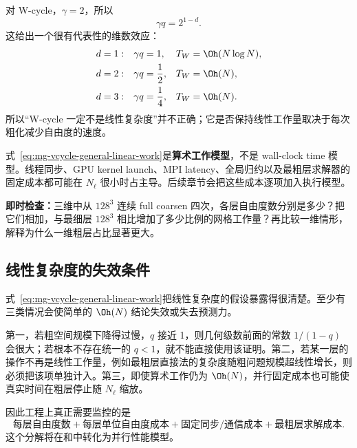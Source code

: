 对 W-cycle，$\gamma=2$，所以
\begin{equation}
\gamma q
=
2^{1-d}.
\end{equation}
这给出一个很有代表性的维数效应：
\begin{equation}
\begin{aligned}
d=1:&\quad \gamma q=1,
&&T_W=\Oh(N\log N),\\
d=2:&\quad \gamma q=\frac12,
&&T_W=\Oh(N),\\
d=3:&\quad \gamma q=\frac14,
&&T_W=\Oh(N).
\end{aligned}
\label{eq:mg-wcycle-dimensional-complexity}
\end{equation}
所以“W-cycle 一定不是线性复杂度”并不正确；它是否保持线性工作量取决于每次粗化减少自由度的速度。

式~\eqref{eq:mg-vcycle-general-linear-work}是\textbf{算术工作模型}，不是 wall-clock time 模型。线程同步、GPU kernel launch、MPI latency、全局归约以及最粗层求解器的固定成本都可能在 $N_\ell$ 很小时占主导。后续章节会把这些成本逐项加入执行模型。

\begin{checkpointbox}
\textbf{即时检查：}三维中从 $128^3$ 连续 full coarsen 四次，各层自由度数分别是多少？把它们相加，与最细层 $128^3$ 相比增加了多少比例的网格工作量？再比较一维情形，解释为什么一维粗层占比显著更大。
\end{checkpointbox}

\subsection{线性复杂度的失效条件}

式~\eqref{eq:mg-vcycle-general-linear-work}把线性复杂度的假设暴露得很清楚。至少有三类情况会使简单的 $\Oh(N)$ 结论失效或失去预测力。

第一，若粗空间规模下降得过慢，$q$ 接近 1，则几何级数前面的常数 $1/(1-q)$ 会很大；若根本不存在统一的 $q<1$，就不能直接使用该证明。第二，若某一层的操作不再是线性工作量，例如最粗层直接法的复杂度随粗问题规模超线性增长，则必须把该项单独计入。第三，即使算术工作仍为 $\Oh(N)$，并行固定成本也可能使真实时间在粗层停止随 $N_\ell$ 缩放。

因此工程上真正需要监控的是
\begin{equation}
\boxed{
\text{每层自由度数}
+\text{每层单位自由度成本}
+\text{固定同步/通信成本}
+\text{最粗层求解成本}.
}
\label{eq:mg-work-model-components}
\end{equation}
这个分解将在和中转化为并行性能模型。

